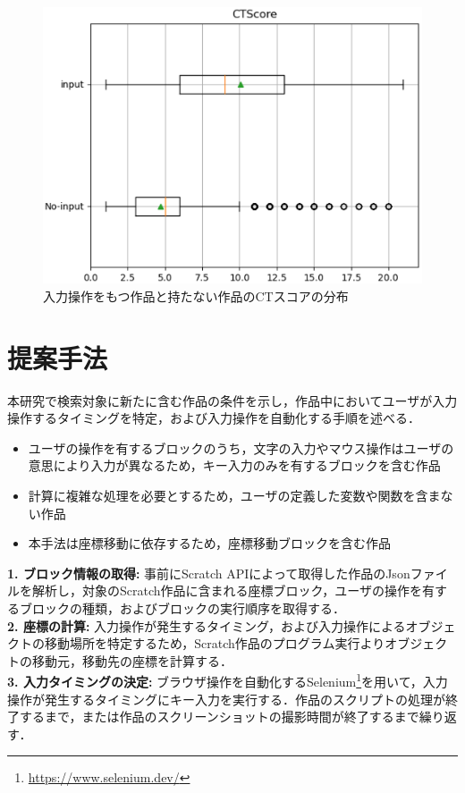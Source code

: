 \documentclass[uplatex,dvipdfmx,a4paper,twocolumn,base=11pt,jbase=11pt,ja=standard]{bxjsarticle}  %
\begin{document}
\begin{figure}
    \begin{center}
        \includegraphics[width=1\linewidth]{plot.eps}
        \caption{入力操作をもつ作品と持たない作品のCTスコアの分布}
        \label{fig:score}
    \end{center}
\vspace{-13mm}
\end{figure}


\section{提案手法}
本研究で検索対象に新たに含む作品の条件を示し，作品中においてユーザが入力操作するタイミングを特定，および入力操作を自動化する手順を述べる．%
\begin{itemize}
 \item ユーザの操作を有するブロックのうち，文字の入力やマウス操作はユーザの意思により入力が異なるため，キー入力のみを有するブロックを含む作品
 \item 計算に複雑な処理を必要とするため，ユーザの定義した変数や関数を含まない作品
 \item 本手法は座標移動に依存するため，座標移動ブロックを含む作品
\end{itemize}

\noindent\textbf{1. ブロック情報の取得: }事前にScratch APIによって取得した作品のJsonファイルを解析し，対象のScratch作品に含まれる座標ブロック，ユーザの操作を有するブロックの種類，およびブロックの実行順序を取得する．\\
\noindent\textbf{2. 座標の計算: }入力操作が発生するタイミング，および入力操作によるオブジェクトの移動場所を特定するため，Scratch作品のプログラム実行よりオブジェクトの移動元，移動先の座標を計算する．\\
\noindent\textbf{3. 入力タイミングの決定: }ブラウザ操作を自動化するSelenium\footnote{\url{https://www.selenium.dev/}}を用いて，入力操作が発生するタイミングにキー入力を実行する．作品のスクリプトの処理が終了するまで，または作品のスクリーンショットの撮影時間が終了するまで繰り返す．
\end{document}
